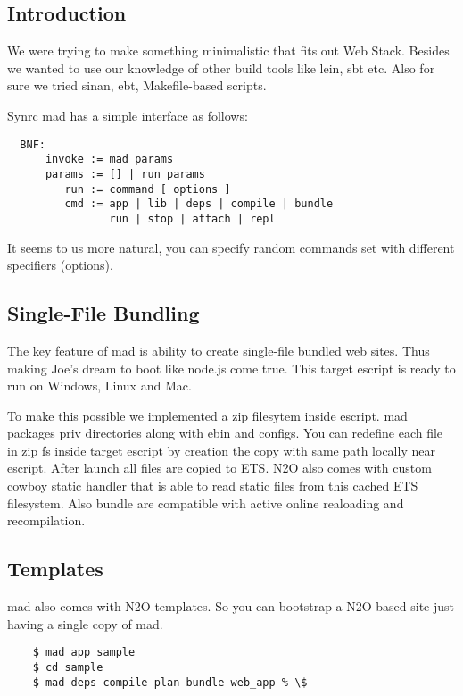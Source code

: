 \subsection{Introduction}

We were trying to make something minimalistic that fits out Web Stack.
Besides we wanted to use our knowledge of other build tools like lein, sbt etc.
Also for sure we tried sinan, ebt, Makefile-based scripts.

Synrc mad has a simple interface as follows:

\vspace{1\baselineskip}
\begin{lstlisting}
  BNF:
      invoke := mad params
      params := [] | run params
         run := command [ options ]
         cmd := app | lib | deps | compile | bundle
                run | stop | attach | repl
\end{lstlisting}
\vspace{1\baselineskip}

It seems to us more natural, you can specify random
commands set with different specifiers (options).

\subsection{Single-File Bundling}

The key feature of mad is ability to create single-file bundled web sites.
Thus making Joe's dream to boot like node.js come true.
This target escript is ready to run on Windows, Linux and Mac.

To make this possible we implemented a zip filesytem inside escript.
mad packages priv directories along with ebin and configs.
You can redefine each file in zip fs inside target
escript by creation the copy with same path locally near escript.
After launch all files are copied to ETS.
N2O also comes with custom cowboy static handler that is able to
read static files from this cached ETS filesystem.
Also bundle are compatible with active online realoading and recompilation.

\subsection{Templates}

mad also comes with N2O templates. So you can bootstrap a N2O-based site
just having a single copy of mad.

\vspace{1\baselineskip}
\begin{lstlisting}
    $ mad app sample
    $ cd sample
    $ mad deps compile plan bundle web_app % \$
\end{lstlisting}
\vspace{1\baselineskip}

